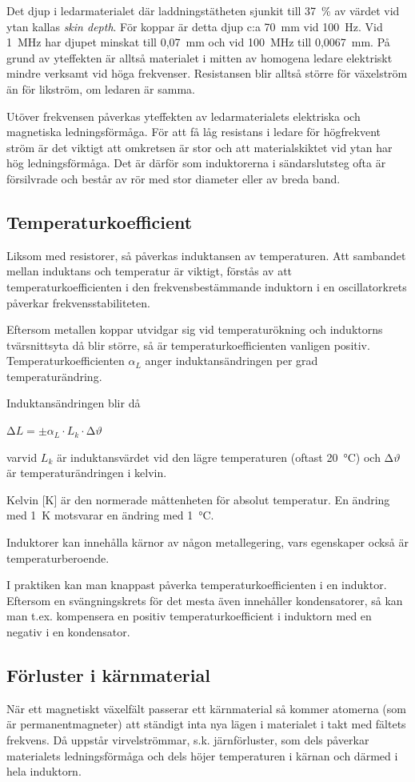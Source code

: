 Det djup i ledarmaterialet där laddningstätheten sjunkit till 37~\% av
värdet vid ytan kallas \emph{skin depth}. För koppar är detta djup c:a 70~mm vid
100~Hz. Vid 1~MHz har djupet minskat till 0,07~mm och vid 100~MHz till
0,0067~mm. På grund av yteffekten är alltså materialet i mitten av homogena
ledare elektriskt mindre verksamt vid höga frekvenser. Resistansen blir alltså
större för växelström än för likström, om ledaren är samma.

Utöver frekvensen påverkas yteffekten av ledarmaterialets elektriska och
magnetiska ledningsförmåga. För att få låg resistans i ledare för högfrekvent
ström är det viktigt att omkretsen är stor och att materialskiktet vid ytan har
hög ledningsförmåga. Det är därför som induktorerna i sändarslutsteg ofta är
försilvrade och består av rör med stor diameter eller av breda band.

\subsection{Temperaturkoefficient}

Liksom med resistorer, så påverkas induktansen av temperaturen. Att sambandet
mellan induktans och temperatur är viktigt, förstås av att
temperaturkoefficienten i den frekvensbestämmande induktorn i en oscillatorkrets
påverkar frekvensstabiliteten.

Eftersom metallen koppar utvidgar sig vid temperaturökning och induktorns
tvärsnittsyta då blir större, så är temperaturkoefficienten vanligen positiv.
Temperaturkoefficienten \(\alpha_L\) anger induktansändringen per grad temperaturändring.

Induktansändringen blir då

\(∆L = \pm \alpha _L \cdot L_k \cdot ∆\vartheta\)

varvid \(L_k\) är induktansvärdet vid den lägre temperaturen (oftast 20~°C) och
\(∆\vartheta\) är temperaturändringen i kelvin.

Kelvin [K] är den normerade måttenheten för absolut temperatur. En ändring med
1~K motsvarar en ändring med 1~°C.

Induktorer kan innehålla kärnor av någon metallegering, vars egenskaper också är
temperaturberoende.

I praktiken kan man knappast påverka temperaturkoefficienten i en induktor.
Eftersom en svängningskrets för det mesta även innehåller kondensatorer, så kan
man t.ex. kompensera en positiv temperaturkoefficient i induktorn med en negativ
i en kondensator.

\subsection{Förluster i kärnmaterial}

När ett magnetiskt växelfält passerar ett kärnmaterial så kommer atomerna (som
är permanentmagneter) att ständigt inta nya lägen i materialet i takt med
fältets frekvens. Då uppstår virvelströmmar, s.k. järnförluster, som dels
påverkar materialets ledningsförmåga och dels höjer temperaturen i kärnan och
därmed i hela induktorn.
